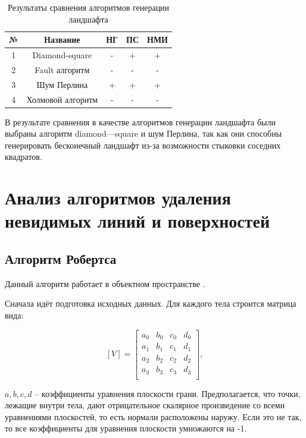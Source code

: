 \begin{table}[h!]
	\small
	\caption{\label{table:landscape}Результаты сравнения алгоритмов генерации ландшафта}
	\begin{center}
		\begin{tabular}{|c|c|c|c|c|}
			\hline
			№ & Название & НГ & ПС & НМИ \\
			\hline
			1 & Diamond-square & {-} & {+} & {+}\\
			\hline
			2 & Fault алгоритм & {-} & {-} & {-}\\
			\hline
			3 & Шум Перлина & {+} & {+} & {+}\\
			\hline
			4 & Холмовой алгоритм & {-} & {-} & {-}\\
			\hline
		\end{tabular}
	\end{center}
\end{table}

В результате сравнения в качестве алгоритмов генерации ландшафта были выбраны алгоритм diamond---square и шум Перлина, так как они способны генерировать бесконечный ландшафт из-за возможности стыковки соседних квадратов.

\section{Анализ алгоритмов удаления невидимых линий и поверхностей}

\subsection{Алгоритм Робертса}

Данный алгоритм работает в объектном пространстве \cite{roberts}.

Сначала идёт подготовка исходных данных. Для каждого тела строится матрица
вида:

\begin{equation}
	\label{eq:D}
	[V] = \begin{bmatrix}
		a_{0} & b_{0} & c_{0} & d_{0} \\
		a_{1} & b_{1} & c_{1} & d_{1} \\
		a_{2} & b_{2} & c_{2} & d_{2} \\
		a_{3} & b_{3} & c_{3} & d_{3} \\
	\end{bmatrix},
\end{equation}

$a, b, c, d$ -- коэффициенты уравнения плоскости грани. Предполагается, что
точки, лежащие внутри тела, дают отрицательное скалярное произведение со всеми уравнениями плоскостей, то есть нормали расположены наружу. Если это не так, то все коэффициенты для уравнения плоскости умножаются на -1.

